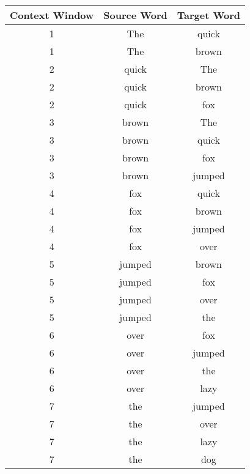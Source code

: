 \documentclass[11pt,a4paper]{article}
\begin{document}
\begin{table}[t]
    \centering
    \begin{tabular}{ccc}
        \toprule
        Context Window & Source Word & Target Word \\
        \midrule
        1              & The         & quick       \\
        1              & The         & brown       \\
        2              & quick       & The         \\
        2              & quick       & brown       \\
        2              & quick       & fox         \\
        3              & brown       & The         \\
        3              & brown       & quick       \\
        3              & brown       & fox         \\
        3              & brown       & jumped      \\
        4              & fox         & quick       \\
        4              & fox         & brown       \\
        4              & fox         & jumped      \\
        4              & fox         & over        \\
        5              & jumped      & brown       \\
        5              & jumped      & fox         \\
        5              & jumped      & over        \\
        5              & jumped      & the         \\
        6              & over        & fox         \\
        6              & over        & jumped      \\
        6              & over        & the         \\
        6              & over        & lazy        \\
        7              & the         & jumped      \\
        7              & the         & over        \\
        7              & the         & lazy        \\
        7              & the         & dog         \\

\end{tabular}
\end{table}
\end{document}
